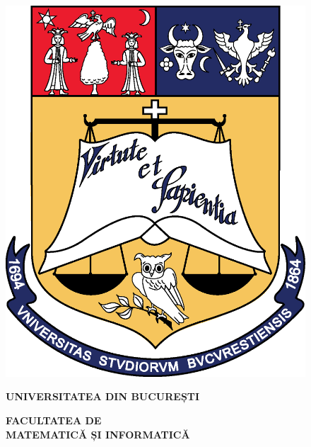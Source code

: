 \begin{titlepage}
    
    \begin{figure}[!htb]
        \centering
        \begin{minipage}{0.2\textwidth}
            \includegraphics[width=\linewidth]{"images/logo-ub.png"}
        \end{minipage}
        \begin{minipage}{0.5\textwidth}
            \large
            \vspace{0.2cm}
            \begin{center}
                \textbf{UNIVERSITATEA DIN BUCUREȘTI}
            \end{center}
            \vspace{0.3cm}
            \begin{center}
                \textbf{
                    FACULTATEA DE \\
                    MATEMATICĂ ȘI INFORMATICĂ
                }
            \end{center}

\end{minipage}
\end{figure}
\end{titlepage}
